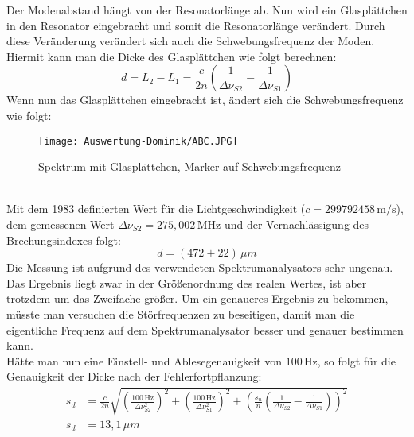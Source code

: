 Der Modenabstand hängt von der Resonatorlänge ab.
Nun wird ein Glasplättchen in den Resonator eingebracht und somit die Resonatorlänge verändert.
Durch diese Veränderung verändert sich auch die Schwebungsfrequenz der Moden.
Hiermit kann man die Dicke des Glasplättchen wie folgt berechnen:
\begin{equation}
    d=L_2-L_1=\frac{c}{2n}\left(\frac{1}{\Delta\nu_{S2}}-\frac{1}{\Delta\nu_{S1}}\right)
\end{equation}\newpage
Wenn nun das Glasplättchen eingebracht ist, ändert sich die Schwebungsfrequenz wie folgt:
\begin{figure}[h]
    \centering\texttt{[image: Auswertung-Dominik/ABC.JPG]}
    \caption{Spektrum mit Glasplättchen, Marker auf Schwebungsfrequenz}
\end{figure}\\
Mit dem 1983 definierten Wert für die Lichtgeschwindigkeit ($c=299792458\,\text{m/s}$), dem gemessenen Wert $\Delta\nu_{S2}=275,002\,\text{MHz}$ und der Vernachlässigung des Brechungsindexes folgt:
\begin{equation}
    d=\left(472\pm22\right)\,\mu m
\end{equation}
Die Messung ist aufgrund des verwendeten Spektrumanalysators sehr ungenau.
Das Ergebnis liegt zwar in der Größenordnung des realen Wertes, ist aber trotzdem um das Zweifache größer.
Um ein genaueres Ergebnis zu bekommen, müsste man versuchen die Störfrequenzen zu beseitigen, damit man die eigentliche Frequenz auf dem Spektrumanalysator besser und genauer bestimmen kann.\\

Hätte man nun eine Einstell- und Ablesegenauigkeit von $100\,\text{Hz}$, so folgt für die Genauigkeit der Dicke nach der Fehlerfortpflanzung:
\begin{align}
    s_d&=\frac{c}{2n}\sqrt{\left(\frac{100\,\text{Hz}}{\Delta\nu_{S2}^2}\right)^2+\left(\frac{100\,\text{Hz}}{\Delta\nu_{S1}^2}\right)^2+\left(\frac{s_n}{n}\left(\frac{1}{\Delta\nu_{S2}}-\frac{1}{\Delta\nu_{S1}}\right)\right)^2}\\
    s_d&=13,1\,\mu m
\end{align}
\newpage